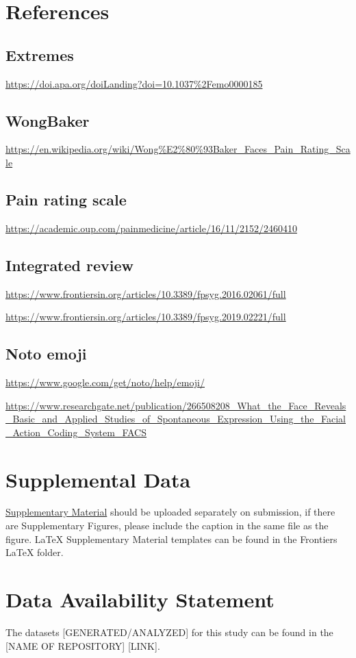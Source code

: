 \documentclass[utf8]{frontiersSCNS} %
\begin{document}
\section{References}

\subsection{Extremes}
\url{https://doi.apa.org/doiLanding?doi=10.1037%2Femo0000185}

\subsection{WongBaker}
\url{https://en.wikipedia.org/wiki/Wong%E2%80%93Baker_Faces_Pain_Rating_Scale}

\subsection{Pain rating scale}

\url{https://academic.oup.com/painmedicine/article/16/11/2152/2460410}

\subsection{Integrated review}

\url{https://www.frontiersin.org/articles/10.3389/fpsyg.2016.02061/full}

\url{https://www.frontiersin.org/articles/10.3389/fpsyg.2019.02221/full}

\subsection{Noto emoji}

\url{https://www.google.com/get/noto/help/emoji/}

\url{https://www.researchgate.net/publication/266508208_What_the_Face_Reveals_Basic_and_Applied_Studies_of_Spontaneous_Expression_Using_the_Facial_Action_Coding_System_FACS}

\section*{Supplemental Data}
 \href{http://home.frontiersin.org/about/author-guidelines#SupplementaryMaterial}{Supplementary Material} should be uploaded separately on submission, if there are Supplementary Figures, please include the caption in the same file as the figure. LaTeX Supplementary Material templates can be found in the Frontiers LaTeX folder.

\section*{Data Availability Statement}
The datasets [GENERATED/ANALYZED] for this study can be found in the [NAME OF REPOSITORY] [LINK].



\end{document}
